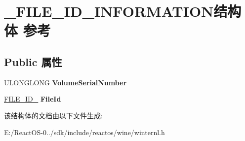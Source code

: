 \hypertarget{struct___f_i_l_e___i_d___i_n_f_o_r_m_a_t_i_o_n}{}\section{\+\_\+\+F\+I\+L\+E\+\_\+\+I\+D\+\_\+\+I\+N\+F\+O\+R\+M\+A\+T\+I\+O\+N结构体 参考}
\label{struct___f_i_l_e___i_d___i_n_f_o_r_m_a_t_i_o_n}
\subsection*{Public 属性}
\begin{DoxyCompactItemize}
\item 
\mbox{\label{struct___f_i_l_e___i_d___i_n_f_o_r_m_a_t_i_o_n_aa841d238549ed7d06fae0e29c317a038}} 
U\+L\+O\+N\+G\+L\+O\+NG {\bfseries Volume\+Serial\+Number}
\item 
\mbox{\label{struct___f_i_l_e___i_d___i_n_f_o_r_m_a_t_i_o_n_a4a0f6c1d8bb1aa3772cc8f4dece587f5}} 
\hyperlink{struct___f_i_l_e___i_d__128}{F\+I\+L\+E\+\_\+\+I\+D\+\_} {\bfseries File\+Id}
\end{DoxyCompactItemize}


该结构体的文档由以下文件生成\+:\begin{DoxyCompactItemize}
\item 
E\+:/\+React\+O\+S-\/0../sdk/include/reactos/wine/winternl.\+h\end{DoxyCompactItemize}
